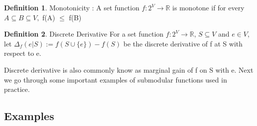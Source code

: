 \documentclass[a4paper,twoside]{iiththesis}
\theoremstyle{definition}
\newtheorem{definition}{Definition}[section]
\theoremstyle{definition}
\theoremstyle{remark}
\begin{document}
\theoremstyle{definition}
\begin{definition}{Monotonicity :}
A set function $f:2^V\rightarrow \mathbb{R}$ is monotone if for every $A \subseteq B \subseteq V,$ f(A) $\leq$ f(B)
\end{definition}
\newpage
\theoremstyle{definition}
\begin{definition}{Discrete Derivative}
For a set function $f:2^V\rightarrow \mathbb{R}$, $S \subseteq V$ and $e\in V$, let $\Delta_{f}(e|S):= f(S \cup \{e\}) - f(S)$ be the discrete derivative of f at S with respect to e.
\end{definition}
Discrete derivative is also commonly know as marginal gain of f on S with e. Next we go through some important examples of submodular functions used in practice.

\subsection{Examples}
\end{document}
